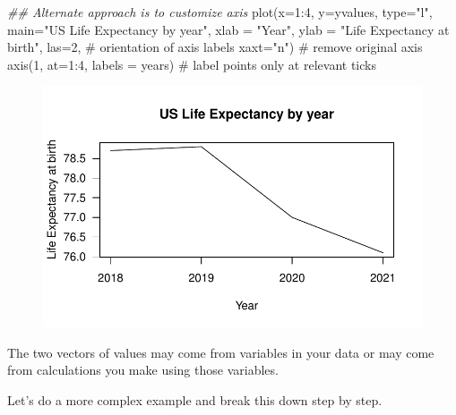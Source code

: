 \documentclass[
  letterpaper,
  DIV=11,
  numbers=noendperiod]{scrreprt}
\newenvironment{Shaded}{\begin{snugshade}}{\end{snugshade}}
\newcommand{\AttributeTok}[1]{\textcolor[rgb]{0.40,0.45,0.13}{#1}}
\newcommand{\CommentTok}[1]{\textcolor[rgb]{0.37,0.37,0.37}{#1}}
\newcommand{\DecValTok}[1]{\textcolor[rgb]{0.68,0.00,0.00}{#1}}
\newcommand{\DocumentationTok}[1]{\textcolor[rgb]{0.37,0.37,0.37}{\textit{#1}}}
\newcommand{\FunctionTok}[1]{\textcolor[rgb]{0.28,0.35,0.67}{#1}}
\newcommand{\NormalTok}[1]{\textcolor[rgb]{0.00,0.23,0.31}{#1}}
\newcommand{\SpecialCharTok}[1]{\textcolor[rgb]{0.37,0.37,0.37}{#1}}
\newcommand{\StringTok}[1]{\textcolor[rgb]{0.13,0.47,0.30}{#1}}
\begin{document}
\begin{Shaded}
\begin{Highlighting}[]
\DocumentationTok{\#\# Alternate approach is to customize axis}
\FunctionTok{plot}\NormalTok{(}\AttributeTok{x=}\DecValTok{1}\SpecialCharTok{:}\DecValTok{4}\NormalTok{,}
     \AttributeTok{y=}\NormalTok{yvalues,}
     \AttributeTok{type=}\StringTok{"l"}\NormalTok{,}
     \AttributeTok{main=}\StringTok{"US Life Expectancy by year"}\NormalTok{,}
     \AttributeTok{xlab =} \StringTok{"Year"}\NormalTok{,}
     \AttributeTok{ylab =} \StringTok{"Life Expectancy at birth"}\NormalTok{,}
     \AttributeTok{las=}\DecValTok{2}\NormalTok{, }\CommentTok{\# orientation of axis labels}
     \AttributeTok{xaxt=}\StringTok{"n"}\NormalTok{) }\CommentTok{\# remove original axis}
\FunctionTok{axis}\NormalTok{(}\DecValTok{1}\NormalTok{, }\AttributeTok{at=}\DecValTok{1}\SpecialCharTok{:}\DecValTok{4}\NormalTok{, }\AttributeTok{labels =}\NormalTok{ years) }\CommentTok{\# label points only at relevant ticks}
\end{Highlighting}
\end{Shaded}

\begin{figure}[H]

{\centering \includegraphics{04-Visualization_files/figure-pdf/unnamed-chunk-28-1.pdf}

}

\end{figure}

The two vectors of values may come from variables in your data or may
come from calculations you make using those variables.

Let's do a more complex example and break this down step by step.
\end{document}

